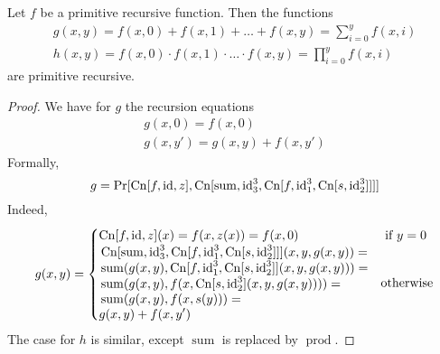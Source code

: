 \begin{exercise}
  Let $f$ be a primitive recursive function.
  Then the functions
  \begin{gather*}
    g(x,y)=f(x,0)+f(x,1)+\ldots+f(x,y)=\sum_{i=0}^y f(x,i)\\
    h(x,y)=f(x,0)\cdot f(x,1)\cdot\ldots\cdot f(x,y)=\prod_{i=0}^y f(x,i)
  \end{gather*}
  are primitive recursive.
\end{exercise}
\begin{proof}
  We have for $g$ the recursion equations
  \begin{gather*}
    g(x,0)=f(x,0)\\
    g(x,y')=g(x,y)+f(x,y')
  \end{gather*}
  Formally,
  \begin{equation*}
    g = \Pr[\operatorname{Cn}[f, \operatorname{id}, z], \operatorname{Cn}[\operatorname{sum}, \operatorname{id}_3^3, \operatorname{Cn}[f, \operatorname{id}_1^3, \operatorname{Cn}[s, \operatorname{id}_2^3]]]]
  \end{equation*}
  Indeed,
  \begin{align*}
    g(x,y) = \begin{cases}
      \operatorname{Cn}[f, \operatorname{id}, z](x) = f(x, z(x)) = f(x, 0) &\text{ if }y = 0\\
      \begin{aligned}
        &\operatorname{Cn}[\operatorname{sum}, \operatorname{id}_3^3, \operatorname{Cn}[f, \operatorname{id}_1^3, \operatorname{Cn}[s, \operatorname{id}_2^3]]](x, y, g(x, y))=\\
        &\operatorname{sum}(g(x, y), \operatorname{Cn}[f, \operatorname{id}_1^3, \operatorname{Cn}[s, \operatorname{id}_2^3]](x, y, g(x, y)))=\\
        &\operatorname{sum}(g(x, y), f(x, \operatorname{Cn}[s,\operatorname{id}_2^3](x, y, g(x, y))))=\\
        &\operatorname{sum}(g(x, y), f(x, s(y)))=\\
        &g(x, y) + f(x, y')
      \end{aligned} &\text{otherwise}
    \end{cases}
  \end{align*}
  The case for $h$ is similar, except $\operatorname{sum}$ is replaced by $\operatorname{prod}$.
\end{proof}

